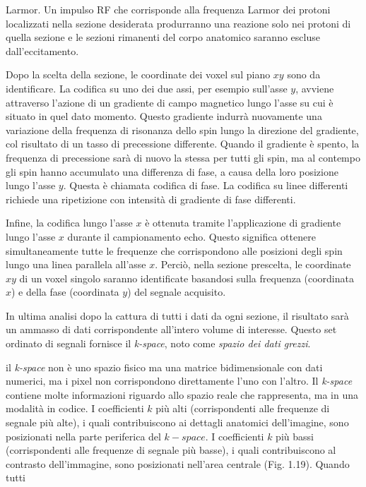 \documentclass[leqno,10pt,twocolumn,a4paper]{article}
\begin{document}
	Larmor. Un impulso RF che corrisponde alla frequenza Larmor dei protoni localizzati nella sezione desiderata produrranno una reazione solo nei protoni di quella sezione e le sezioni rimanenti del corpo
	anatomico saranno escluse dall'eccitamento. \par Dopo la scelta della sezione, le coordinate dei voxel sul piano $xy$ sono da identificare. La codifica su uno dei due assi, per esempio sull'asse $y$,
	avviene attraverso l'azione di un gradiente di campo magnetico lungo l'asse su cui è situato in quel dato momento. Questo gradiente indurrà nuovamente una variazione della frequenza di risonanza 
	dello spin lungo la direzione del gradiente, col risultato di un tasso di precessione differente. Quando il gradiente è spento, la frequenza di precessione sarà di nuovo la stessa per tutti gli spin, ma
	al contempo gli spin hanno accumulato una differenza di fase, a causa della loro posizione lungo l'asse $y$. Questa è chiamata codifica di fase. La codifica su linee differenti richiede una ripetizione con
	intensità di gradiente di fase differenti. \par Infine, la codifica lungo l'asse $x$ è ottenuta tramite l'applicazione di gradiente lungo l'asse $x$ durante il campionamento echo. Questo significa ottenere
	simultaneamente tutte le frequenze che corrispondono alle posizioni degli spin lungo una linea parallela all'asse $x$. Perciò, nella sezione prescelta, le coordinate $xy$ di un voxel singolo saranno 
	identificate basandosi sulla frequenza (coordinata $x$) e della fase (coordinata $y$) del segnale acquisito. \par In ultima analisi dopo la cattura di tutti i dati da ogni sezione, il risultato sarà un ammasso
	di dati corrispondente all'intero volume di interesse. Questo set ordinato di segnali fornisce il \textit{k-space}, noto come \textit{spazio dei dati grezzi}. \par il \textit{k-space} non è uno spazio fisico
	ma una matrice bidimensionale con dati numerici, ma i pixel non corrispondono direttamente l'uno con l'altro. Il \textit{k-space} contiene molte informazioni riguardo allo spazio reale che rappresenta, ma in 
	una modalità in codice. I coefficienti $k$ più alti (corrispondenti alle frequenze di segnale più alte), i quali contribuiscono ai dettagli anatomici dell'imagine, sono posizionati nella parte periferica del
	$k-space$. I coefficienti $k$ più bassi (corrispondenti alle frequenze di segnale più basse), i quali contribuiscono al contrasto dell'immagine, sono posizionati nell'area centrale (Fig. 1.19). Quando tutti
\end{document}
